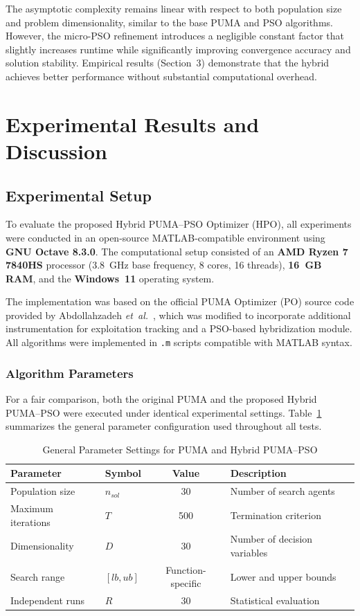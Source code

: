 \documentclass[a4paper,12pt]{article}
\begin{document}
The asymptotic complexity remains linear with respect to both population size and problem dimensionality, similar to the base PUMA and PSO algorithms. However, the micro-PSO refinement introduces a negligible constant factor that slightly increases runtime while significantly improving convergence accuracy and solution stability. Empirical results (Section~3) demonstrate that the hybrid achieves better performance without substantial computational overhead.

\section{Experimental Results and Discussion}
\subsection{Experimental Setup}

To evaluate the proposed Hybrid PUMA--PSO Optimizer (HPO), all experiments were conducted in an open-source MATLAB-compatible environment using \textbf{GNU Octave 8.3.0}. 
The computational setup consisted of an \textbf{AMD Ryzen 7 7840HS} processor (3.8~GHz base frequency, 8 cores, 16 threads), \textbf{16~GB RAM}, and the \textbf{Windows~11} operating system.

The implementation was based on the official PUMA Optimizer (PO) source code provided by Abdollahzadeh \textit{et~al.}~\cite{puma2023}, which was modified to incorporate additional instrumentation for exploitation tracking and a PSO-based hybridization module. 
All algorithms were implemented in \texttt{.m} scripts compatible with MATLAB syntax.

\subsubsection{Algorithm Parameters}
For a fair comparison, both the original PUMA and the proposed Hybrid PUMA--PSO were executed under identical experimental settings. 
Table~\ref{tab:params} summarizes the general parameter configuration used throughout all tests.

\begin{table}[h!]
\centering
\caption{General Parameter Settings for PUMA and Hybrid PUMA--PSO}
\label{tab:params}
\begin{tabular}{@{}llcl@{}}
\toprule
\textbf{Parameter} & \textbf{Symbol} & \textbf{Value} & \textbf{Description} \\ \midrule
Population size & $n_{sol}$ & 30 & Number of search agents \\
Maximum iterations & $T$ & 500 & Termination criterion \\
Dimensionality & $D$ & 30 & Number of decision variables \\
Search range & $[lb, ub]$ & Function-specific & Lower and upper bounds \\
Independent runs & $R$ & 30 & Statistical evaluation \\ \bottomrule
\end{tabular}
\end{table}
\end{document}
